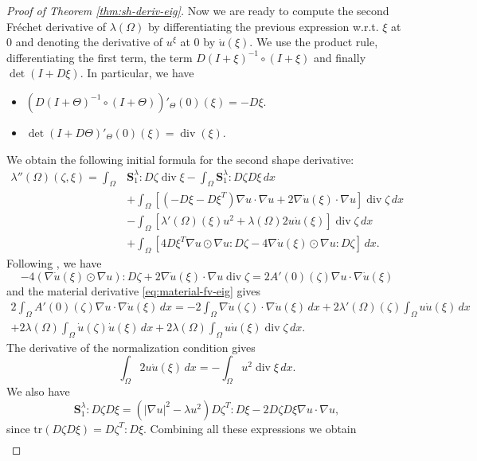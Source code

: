 \documentclass[JEP,XML,SOM,Unicode,ThmDefs,NoFloatCountersInSection,published]{cedram}
\theoremstyle{plain}
\theoremstyle{definition}
\newcommand{\di}{\operatorname{div}}
\newcommand{\bo}[1]{{\boldsymbol#1}}
\begin{document}
\begin{proof}[Proof of Theorem \ref{thm:sh-deriv-eig}]
Now we are ready to compute the second Fréchet derivative of $\lambda(\Omega)$ by differentiating the previous expression w.r.t. $\xi$ at $0$ and denoting the derivative of $u^\xi$ at $0$ by $\dot u(\xi)$. We use the product rule, differentiating the first term, the term $D(I+\xi)^{-1}\circ (I+\xi)$ and finally $\det(I+D\xi)$. In particular, we have
\begin{itemize}
\item $(D(I+\Theta)^{-1}\circ (I+\Theta))'_\Theta(0)(\xi) = - D\xi$.
\item $\det(I+D\Theta)'_\Theta(0)(\xi) = \di(\xi)$.
\end{itemize}

We obtain the following initial formula for the second shape derivative:
\begin{align*}
\lambda''(\Omega)(\zeta,\xi)  = \int_\Omega& \bo S_1^\lambda : D\zeta \di \xi - \int_\Omega \bo S_1^\lambda : D\zeta D\xi \, dx \\
&+ \int_\Omega [(-D\xi -D\xi^T) \nabla u \cdot \nabla u + 2 \nabla \dot u(\xi)\cdot \nabla u] \di \zeta\, dx \\
&-\int_\Omega [\lambda'(\Omega)(\xi) u^2 + \lambda(\Omega) 2 u \dot u(\xi)
]\di \zeta \, dx \\
&+\int_\Omega [4 D\xi^T \nabla u \odot \nabla u:D\zeta -4 \nabla \dot u(\xi) \odot \nabla u:D\zeta ]\, dx.
\end{align*}
Following \cite[p.\,25]{laurain2ndDeriv}, we have
\[
-4(\nabla \dot u(\xi) \odot \nabla u):D\zeta +2\nabla \dot u(\xi)\cdot \nabla u \di \zeta = 2A'(0)(\zeta)\nabla u \cdot \nabla \dot u(\xi)
\]
and the material derivative \eqref{eq:material-fv-eig} gives
\vspace*{-5pt}
\begin{multline*} 2\int_\Omega A'(0)(\zeta) \nabla u \cdot \nabla \dot u(\xi)\, dx = -2\int_\Omega \nabla \dot u(\zeta)\cdot \nabla \dot u(\xi) \, dx+2 \lambda'(\Omega)(\zeta) \int_\Omega u\dot u(\xi)\, dx\\
+2\lambda(\Omega)\int_\Omega \dot u(\zeta)\dot u(\xi)\, dx +2 \lambda(\Omega) \int_\Omega u\dot u(\xi)\di \zeta\, dx.
\end{multline*}
The derivative of the normalization condition gives
\[
\int_\Omega 2u\dot u(\xi) \, dx= - \int_\Omega u^2 \di \xi\, dx.
\]
We also have
\[
\bo S_1^\lambda : D\zeta D \xi = (|\nabla u|^2-\lambda u^2) D\zeta^T : D\xi - 2D\zeta D\xi \nabla u \cdot \nabla u,
\]
since $\text{tr} (D\zeta D\xi) = D\zeta^T: D\xi$.
Combining all these expressions we obtain
\begin{align*}

\end{align*}
\end{proof}
\end{document}
